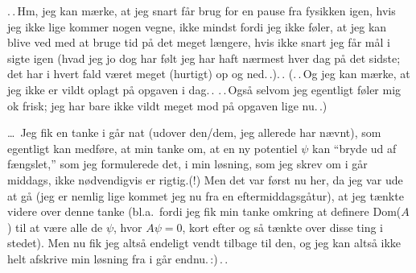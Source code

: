 \documentclass{report}
\begin{document}
.\,.\,Hm, jeg kan mærke, at jeg snart får brug for en pause fra fysikken igen, hvis jeg ikke lige kommer nogen vegne, ikke mindst fordi jeg ikke føler, at jeg kan blive ved med at bruge tid på det meget længere, hvis ikke snart jeg får mål i sigte igen (hvad jeg jo dog har følt jeg har haft nærmest hver dag på det sidste; det har i hvert fald været meget (hurtigt) op og ned.\,.).\,. (.\,.\,Og jeg kan mærke, at jeg ikke er vildt oplagt på opgaven i dag.\,. .\,.\,Også selvom jeg egentligt føler mig ok frisk; jeg har bare ikke vildt meget mod på opgaven lige nu.\,.)

\ldots\ Jeg fik en tanke i går nat (udover den/dem, jeg allerede har nævnt), som egentligt kan medføre, at min tanke om, at en ny potentiel $\psi$ kan ``bryde ud af fængslet,'' som jeg formulerede det, i min løsning, som jeg skrev om i går middags, ikke nødvendigvis er rigtig.(!) Men det var først nu her, da jeg var ude at gå (jeg er nemlig lige kommet jeg nu fra en eftermiddagsgåtur), at jeg tænkte videre over denne tanke (bl.a.\ fordi jeg fik min tanke omkring at definere Dom($A$) til at være alle de $\psi$, hvor $A \psi = 0$, kort efter og så tænkte over disse ting i stedet). Men nu fik jeg altså endeligt vendt tilbage til den, og jeg kan altså ikke helt afskrive min løsning fra i går endnu.\,:)\,.\,.
\end{document}
